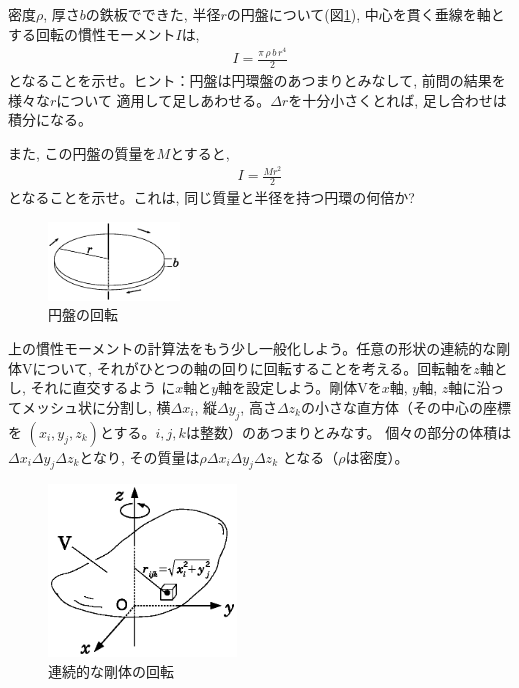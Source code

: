 %
\begin{q}\label{q:mominert_plate}
密度$\rho$, 厚さ$b$の鉄板でできた, 半径$r$の円盤について(図\ref{fig:disk5}), 
中心を貫く垂線を軸とする回転の慣性モーメント$I$は, 
\begin{eqnarray}
I=\frac{\pi\,\rho\,b\,r^4}{2}\label{eq:mominert_disk}
\end{eqnarray}
となることを示せ。ヒント：円盤は円環盤のあつまりとみなして, 前問の結果を様々な$r$について
適用して足しあわせる。$\Delta r$を十分小さくとれば, 足し合わせは積分になる。

また, この円盤の質量を$M$とすると, 
\begin{eqnarray}
I=\frac{Mr^2}{2}\label{eq:mominert_disc_horizon}
\end{eqnarray}
となることを示せ。これは, 同じ質量と半径を持つ円環の何倍か?
\begin{figure}[h]
    \centering
    \includegraphics[width=3.5cm]{disk5.eps}
    \caption{円盤の回転}\label{fig:disk5}
\end{figure}
\end{q}

上の慣性モーメントの計算法をもう少し一般化しよう。任意の形状の連続的な剛体Vについて, 
それがひとつの軸の回りに回転することを考える。回転軸を$z$軸とし, それに直交するよう
に$x$軸と$y$軸を設定しよう。剛体Vを$x$軸, $y$軸, $z$軸に沿ってメッシュ状に分割し, 
横$\Delta x_i$, 縦$\Delta y_j$, 高さ$\Delta z_k$の小さな直方体（その中心の座標を
$(x_i, y_j, z_k)$とする。$i, j, k$は整数）のあつまりとみなす。
個々の部分の体積は$\Delta x_i \Delta y_j \Delta z_k$となり, その質量は$\rho \Delta x_i \Delta y_j \Delta z_k$
となる（$\rho$は密度）。

\begin{figure}[h]
    \centering
    \includegraphics[width=5cm]{angular_mom_rigid.eps}
    \caption{連続的な剛体の回転}\label{fig:angular_mom_rigid}
\end{figure}

